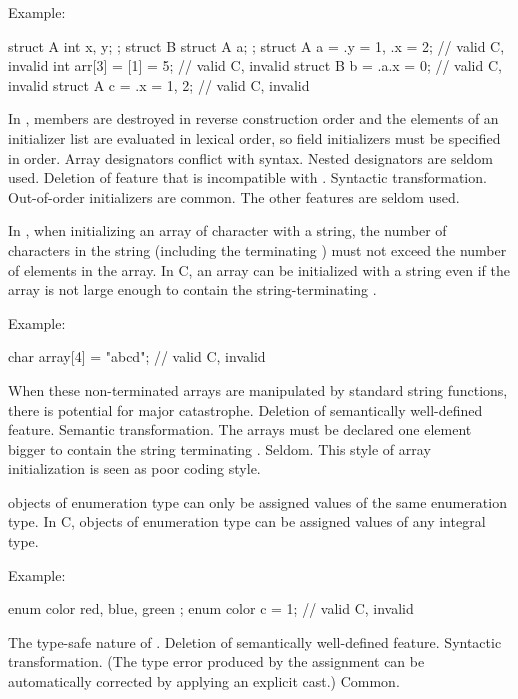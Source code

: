 Example:
\begin{codeblock}
struct A { int x, y; };
struct B { struct A a; };
struct A a = {.y = 1, .x = 2};  // valid C, invalid \Cpp{}
int arr[3] = {[1] = 5};         // valid C, invalid \Cpp{}
struct B b = {.a.x = 0};        // valid C, invalid \Cpp{}
struct A c = {.x = 1, 2};       // valid C, invalid \Cpp{}
\end{codeblock}
\rationale
In \Cpp{}, members are destroyed in reverse construction order
and the elements of an initializer list are evaluated in lexical order,
so field initializers must be specified in order.
Array designators conflict with  syntax.
Nested designators are seldom used.
\effect
Deletion of feature that is incompatible with \Cpp{}.
\difficulty
Syntactic transformation.
\howwide
Out-of-order initializers are common.
The other features are seldom used.

\change
In \Cpp{}, when initializing an array of character with a string, the number of
characters in the string (including the terminating ) must not exceed the
number of elements in the array. In C, an array can be initialized with a string even if
the array is not large enough to contain the string-terminating .

Example:
\begin{codeblock}
char array[4] = "abcd";         // valid C, invalid \Cpp{}
\end{codeblock}
\rationale
When these non-terminated arrays are manipulated by standard
string functions, there is potential for major catastrophe.
\effect
Deletion of semantically well-defined feature.
\difficulty
Semantic transformation.
The arrays must be declared one element bigger to contain the
string terminating .
\howwide
Seldom.
This style of array initialization is seen as poor coding style.

\change
\Cpp{} objects of enumeration type can only be assigned values of the same enumeration type.
In C, objects of enumeration type can be assigned values of any integral type.

Example:
\begin{codeblock}
enum color { red, blue, green };
enum color c = 1;               // valid C, invalid \Cpp{}
\end{codeblock}

\rationale
The type-safe nature of \Cpp{}.
\effect
Deletion of semantically well-defined feature.
\difficulty
Syntactic transformation.
(The type error produced by the assignment can be automatically
corrected by applying an explicit cast.)
\howwide
Common.

